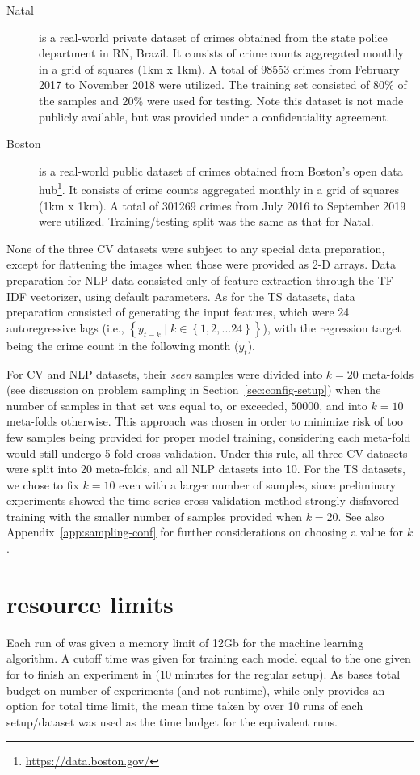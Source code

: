\begin{description}
\item[Natal]
is a real-world private dataset of crimes obtained from the state police department in RN, Brazil. It consists of crime counts aggregated monthly in a grid of squares (1km x 1km). A total of 98553 crimes from February 2017 to November 2018 were utilized. The training set consisted of 80\% of the samples and 20\% were used for testing. Note this dataset is not made publicly available, but was provided under a confidentiality agreement.

\item[Boston]
is a real-world public dataset of crimes obtained from Boston's open data hub\footnote{\url{https://data.boston.gov/}}.  It consists of crime counts aggregated monthly in a grid of squares (1km x 1km). A total of 301269 crimes from July 2016 to September 2019 were utilized. Training/testing split was the same as that for Natal.
\end{description}

None of the three CV datasets were subject to any special data preparation, except for flattening the images when those were provided as 2-D arrays. Data preparation for NLP data consisted only of feature extraction through the \sklearn TF-IDF vectorizer, using default parameters. As for the TS datasets, data preparation consisted of generating the input features, which were 24 autoregressive lags (i.e., $\left \{ y_{t-k} \mid k \in \left \{ 1,2,...24 \right \} \right \}$), with the regression target being the crime count in the following month ($y_t$).

For CV and NLP datasets, their \textit{seen} samples were divided into $k=20$ meta-folds (see discussion on problem sampling in Section~\ref{sec:config-setup}) when the number of samples in that set was equal to, or exceeded, $50000$, and into $k=10$ meta-folds otherwise. This approach was chosen in order to minimize risk of too few samples being provided for proper model training, considering each meta-fold would still undergo 5-fold cross-validation. Under this rule, all three CV datasets were split into 20 meta-folds, and all NLP datasets into 10. For the TS datasets, we chose to fix $k=10$ even with a larger number of samples, since preliminary experiments showed the time-series cross-validation method strongly disfavored training with the smaller number of samples provided when $k=20$. See also Appendix~\ref{app:sampling-conf} for further considerations on choosing a value for $k$.

\section{\autosklearn resource limits}
Each run of \autosklearn was given a memory limit of 12Gb for the machine learning algorithm. A cutoff time was given for training each model equal to the one given for \irace to finish an experiment in \isklearn (10 minutes for the regular setup). As \isklearn bases total budget on number of experiments (and not runtime), while \autosklearn only provides an option for total time limit, the mean time taken by \isklearn over 10 runs of each setup/dataset was used as the time budget for the equivalent \autosklearn runs.

